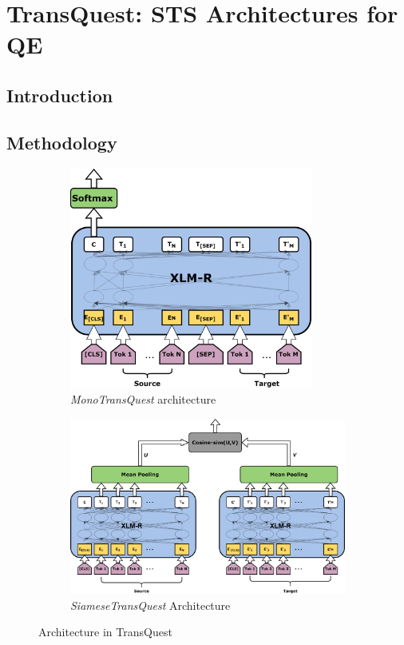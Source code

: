 \chapter{\label{cha:transquest}TransQuest: STS Architectures for QE}

\section{Introduction}
\cite{conneau-etal-2020-unsupervised} 
\section{Methodology}



\begin{figure}[!ht]
	\centering
	\begin{subfigure}[b]{10cm}
		\centering\includegraphics[width=8cm]{figures/translation_quality_estimation/TransQuest.png}
		\caption{\textit{MonoTransQuest} architecture}
		\label{fig:monotransquest}
	\end{subfigure}
	\begin{subfigure}[b]{10cm}
		\centering\includegraphics[width=12cm]{figures/translation_quality_estimation/SiameseTransQuest.png}
		\caption{\textit{SiameseTransQuest} Architecture}
		\label{fig:siamesetransquest}
	\end{subfigure}
	
	\caption{Architecture in TransQuest}
	\label{fig:architecture}
\end{figure}


